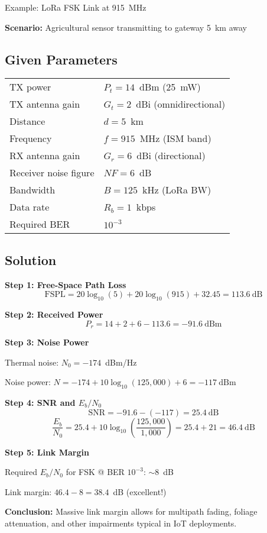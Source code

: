 \begin{calloutbox}{Example: LoRa FSK Link at 915~MHz}

\textbf{Scenario:} Agricultural sensor transmitting to gateway 5~km away

\subsection*{Given Parameters}

\begin{tabular}{@{}ll@{}}
TX power & $P_t = 14$~dBm (25~mW) \\
TX antenna gain & $G_t = 2$~dBi (omnidirectional) \\
Distance & $d = 5$~km \\
Frequency & $f = 915$~MHz (ISM band) \\
RX antenna gain & $G_r = 6$~dBi (directional) \\
Receiver noise figure & $NF = 6$~dB \\
Bandwidth & $B = 125$~kHz (LoRa BW) \\
Data rate & $R_b = 1$~kbps \\
Required BER & $10^{-3}$ \\
\end{tabular}

\subsection*{Solution}

\textbf{Step 1: Free-Space Path Loss}
\begin{equation}
\mathrm{FSPL} = 20\log_{10}(5) + 20\log_{10}(915) + 32.45 = 113.6~\text{dB}
\end{equation}

\textbf{Step 2: Received Power}
\begin{equation}
P_r = 14 + 2 + 6 - 113.6 = -91.6~\text{dBm}
\end{equation}

\textbf{Step 3: Noise Power}

Thermal noise: $N_0 = -174$~dBm/Hz

Noise power: $N = -174 + 10\log_{10}(125{,}000) + 6 = -117~\text{dBm}$

\textbf{Step 4: SNR and $E_b/N_0$}
\begin{equation}
\mathrm{SNR} = -91.6 - (-117) = 25.4~\text{dB}
\end{equation}
\begin{equation}
\frac{E_b}{N_0} = 25.4 + 10\log_{10}\left(\frac{125{,}000}{1{,}000}\right) = 25.4 + 21 = 46.4~\text{dB}
\end{equation}

\textbf{Step 5: Link Margin}

Required $E_b/N_0$ for FSK @ BER $10^{-3}$: $\sim$8~dB

Link margin: $46.4 - 8 = 38.4$~dB (excellent!)

\textbf{Conclusion:} Massive link margin allows for multipath fading, foliage attenuation, and other impairments typical in IoT deployments.
\end{calloutbox}

